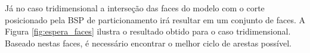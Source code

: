 Já no caso tridimensional a interseção das faces do modelo com o corte posicionado pela BSP de particionamento irá resultar em um conjunto de faces. A Figura \ref{fig:espera_faces} ilustra o resultado obtido para o caso tridimensional. Baseado nestas faces, é necessário encontrar o melhor ciclo de arestas possível.


\begin{figure}[!ht]
   	\centering
   	\qquad
\end{figure}
